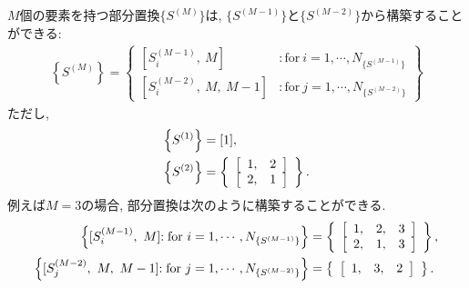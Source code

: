 $M$個の要素を持つ部分置換$\{S^{(M)}\}$は, $\{S^{(M-1)}\}$と$\{S^{(M-2)}\}$から構築することができる:
\begin{align}
  \left\{S^{(M)}\right\}
  =
  \left\{
  \begin{array}{cc}
   \left[ S_{i}^{(M-1)},~ M \right]
         &\mathrm{ : for }~ i = 1, \cdots, N_{\{S^{(M-1)}\}}  \\
   \left[ S_{i}^{(M-2)},~ M ,~ M-1 \right]
         &\mathrm{ : for }~ j = 1, \cdots, N_{\{S^{(M-2)}\}}
  \end{array}
  \right\}
\end{align}
ただし, 
\begin{align}
    \left\{S^{(1)}\right\} &= [1] ,\notag \\
    \left\{S^{(2)}\right\} &= \left\{
                    \begin{array}[tb]{cc}
                    \left[\begin{array}{cc} 1, & 2 \end{array} \right] \\
                    \left[\begin{array}{cc} 2, & 1 \end{array} \right] \\
                    \end{array}
            \right\} .
 \notag
\end{align}
例えば$M=3$の場合, 部分置換は次のように構築することができる. 
\begin{align}
  \left\{
          [S_{i}^{(M-1)},~ M] \mathrm{ : for }~ i = 1, \cdots, N_{\{S^{(M-1)}\}}
  \right\}
 &=
  \left\{
         \begin{array}[tb]{cc}
          \left[\begin{array}{ccc} 1, & 2, & 3 \end{array} \right] \\
          \left[\begin{array}{ccc} 2, & 1, & 3 \end{array} \right]
         \end{array}
  \right\},
  \notag
  \\
  \left\{ [S_{j}^{(M-2)},~ M ,~ M-1]
          \mathrm{ : for }~ j = 1, \cdots, N_{\{S^{(M-2)}\}} \right\}
 &=
  \left\{
         \begin{array}[tb]{cc}
          \left[\begin{array}{ccc} 1, & 3, & 2 \end{array} \right]
         \end{array}
  \right\}.
  \notag
\end{align}
